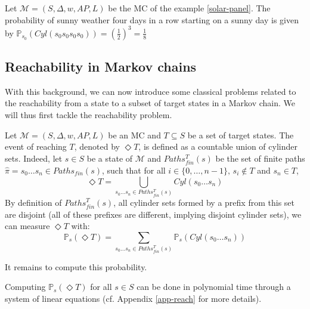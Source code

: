 \begin{example}
  Let $\mathcal{M} = (S, \Delta, w, AP, L)$ be the MC of the example \ref{solar-panel}. The probability of sunny weather four days in a row starting on a sunny day is given
  by $\mathbb{P}_{s_0}(Cyl(s_0s_0s_0s_0)) = (\frac{1}{2})^3 = \frac{1}{8}$
\end{example}

\subsection{Reachability in Markov chains} \label{obj-MC}

With this background, we can now introduce some classical problems related to the reachability from a state to a subset of target states in a Markov chain.
We will thus first tackle the reachability problem.
\begin{definition}
  Let $\mathcal{M} = (S, \Delta, w, AP, L)$ be an MC and $T \subseteq S$ be a set of target states. The event of reaching $T$, denoted by $\Diamond T$,
  is defined as a countable union of cylinder sets. Indeed, let $s \in S$ be a state of $\mathcal{M}$ and $Paths_{fin}^T(s)$ be the set of finite paths $\hat{\pi} = s_0 \dots s_n \in Paths_{fin}(s)$, such that for all $i \in \{0, \dots, n-1 \}, \, s_i \not \in T$ and $s_n \in T$,
  \[ \Diamond T = \bigcup_{s_0 \dots s_n \in Paths_{fin}^T(s)} Cyl(s_0 \dots s_n) \]
  By definition of $Paths^T_{fin}(s)$, all cylinder sets formed by a prefix from this set are disjoint (all of these prefixes are different, implying disjoint cylinder sets), we can measure $\Diamond T$ with:
  \[
    \mathbb{P}_s(\Diamond T) = \sum_{s_0 \dots s_n \in Paths_{fin}^T(s)}  \mathbb{P}_s(Cyl(s_0 \dots s_n))
  \]
\end{definition}
It remains to compute this probability.

\begin{theorem}
Computing $\mathbb{P}_s(\Diamond T)$ for all $s \in S$ can be done in polynomial
time through a system of linear equations (cf. Appendix \ref{app-reach} for more details).
\end{theorem}


